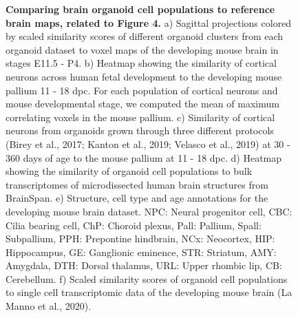 \begin{figure}[h!]
    \centering
    \caption{\textbf{Comparing brain organoid cell populations to reference brain maps, related to Figure 4.} a) Sagittal projections colored by scaled similarity scores of different organoid clusters from each organoid dataset to voxel maps of the developing mouse brain in stages E11.5 - P4. b) Heatmap showing the similarity of cortical neurons across human fetal development to the developing mouse pallium 11 - 18 dpc. For each population of cortical neurons and mouse developmental stage, we computed the mean of maximum correlating voxels in the mouse pallium. c) Similarity of cortical neurons from organoids grown through three different protocols (Birey et al., 2017; Kanton et al., 2019; Velasco et al., 2019) at 30 - 360 days of age to the mouse pallium at 11 - 18 dpc. d) Heatmap showing the similarity of organoid cell populations to bulk transcriptomes of microdissected human brain structures from BrainSpan. e) Structure, cell type and age annotations for the developing mouse brain dataset. NPC: Neural progenitor cell, CBC: Cilia bearing cell, ChP: Choroid plexus, Pall: Pallium, Spall: Subpallium, PPH: Prepontine hindbrain, NCx: Neocortex, HIP: Hippocampus, GE: Ganglionic eminence, STR: Striatum, AMY: Amygdala, DTH: Dorsal thalamus, URL: Upper rhombic lip, CB: Cerebellum. f) Scaled similarity scores of organoid cell populations to single cell transcriptomic data of the developing mouse brain (La Manno et al., 2020).}
\end{figure}

